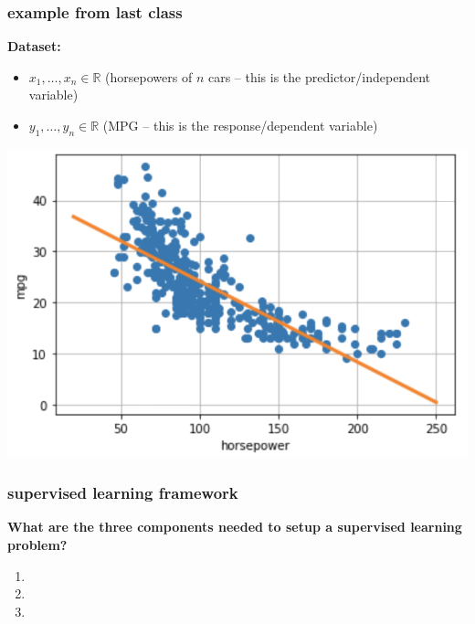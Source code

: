 \documentclass[handout,compress]{beamer}
\newcommand{\R}{\mathbb{R}}
\begin{document}
\begin{frame}
	\frametitle{example from last class}
	\textbf{Dataset:} 
	\vspace{-.5em}
	\begin{itemize}
		\item $x_1, \ldots, x_n \in \R$ (horsepowers of $n$ cars -- this is the predictor/independent variable)
		\item $y_1, \ldots, y_n \in \R$ (MPG -- this is the response/dependent variable)
	\end{itemize}
	\begin{center}
		\includegraphics[width=.5\textwidth]{horsepower_fit.png}
	\end{center}
\end{frame}

\begin{frame}
	\frametitle{supervised learning framework}
	\begin{center}
		\textbf{What are the three components needed to setup a supervised learning problem?}
	\end{center}
	\begin{enumerate}
		\item \vspace{1em}
		\item \vspace{3em}
		\item \vspace{3em}
	\end{enumerate}
\end{frame}
\end{document}
